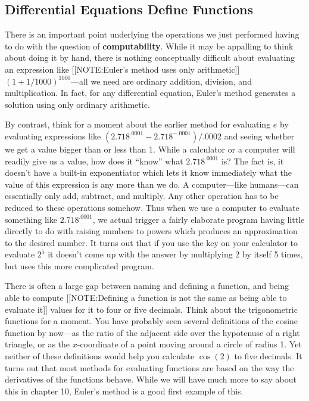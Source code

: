 \subsection{Differential Equations Define Functions}
\label{subsec:differential-equations-define-functions}

There is an important point underlying the operations we just
performed having to do with the question of {\bf
  computability}.  While it may be appalling to
think about doing it by hand, there is nothing conceptually difficult
about evaluating an expression like
[[NOTE:Euler's method uses only arithmetic]]
$(1+1/1000)^{1000}$---all we need are ordinary addition, division, and
multiplication.  In fact, for any differential equation, Euler's
method generates a solution using only ordinary arithmetic.

By contrast, think for a moment about the earlier method for
evaluating $e$ by evaluating expressions like
$(2.718^{.0001}-2.718^{-.0001})/.0002$ and seeing whether we get a
value bigger than or less than 1.  While a calculator or a computer
will readily give us a value, how does it ``know'' what
$2.718^{.0001}$ is?  The fact is, it doesn't have a built-in
exponentiator which lets it know immediately what the value of this
expression is any more than we do.  A computer---like humans---can
essentially only add, subtract, and multiply.  Any other operation has
to be reduced to these operations somehow.  Thus when we use a
computer to evaluate something like $2.718^{.0001}$, we actual trigger
a fairly elaborate program having little directly to do with raising
numbers to powers which produces an approximation to the desired
number.  It turns out that if you use the  key on your
calculator to evaluate $2^5$ it doesn't come up with the answer by
multiplying 2 by itself 5 times, but uses this more complicated
program.

There is often a large gap between naming and defining a function, and
being able to compute
[[NOTE:Defining a function is not the same as being able to evaluate it]]
values for it to four or five decimals.  Think about the trigonometric
functions for a moment.  You have probably seen several definitions of
the cosine function by now---as the ratio of the adjacent side over
the hypotenuse of a right triangle, or as the $x$-coordinate of a
point moving around a circle of radius 1.  Yet neither of these
definitions would help you calculate $\cos(2)$ to five decimals.  It
turns out that most methods for evaluating functions are based on the
way the derivatives of the functions behave.  While we will have much
more to say about this in chapter 10, Euler's method is a good first
example of this.

